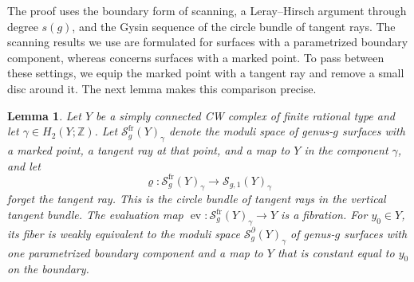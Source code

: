 \documentclass[11pt,reqno]{amsart}
\theoremstyle{plain} %
\newtheorem{lemma}[theorem]{Lemma}
\theoremstyle{definition}
\newcommand{\ZZ}{\mathbb{Z}}
\DeclareMathOperator{\ev}{ev}
\newcommand{\Sc}{\mathcal{S}}
\begin{document}
The proof uses the boundary form of scanning, a Leray--Hirsch argument through degree $s(g)$, and the Gysin sequence of the circle bundle of tangent rays. The scanning results we use are formulated for surfaces with a parametrized boundary component, whereas  concerns surfaces with a marked point. To pass between these settings, we equip the marked point with a tangent ray and remove a small disc around it. The next lemma makes this comparison precise.


\begin{lemma} \label{lem: framed point boundary}
Let $Y$ be a simply connected CW complex of finite rational type and let $\gamma \in  H_2(Y;\ZZ)$. Let $\Sc^{\mathrm{fr}}_g(Y)_\gamma$ denote the moduli space of genus-$g$ surfaces with a marked point, a tangent ray at that point, and a map to $Y$ in the component $\gamma$, and let
\[
\varrho \colon \Sc^{\mathrm{fr}}_g(Y)_\gamma \longrightarrow \Sc_{g,1}(Y)_\gamma
\]
forget the tangent ray. This is the circle bundle of tangent rays in the vertical tangent bundle. The evaluation map $\ev \colon \Sc^{\mathrm{fr}}_g(Y)_\gamma \longrightarrow Y$ is a fibration. For $y_0\in Y$, its fiber is weakly equivalent to the moduli space $\Sc^{\partial}_g(Y)_\gamma$ of genus-$g$ surfaces with one parametrized boundary component and a map to $Y$ that is constant equal to $y_0$ on the boundary.
\end{lemma}
\end{document}
